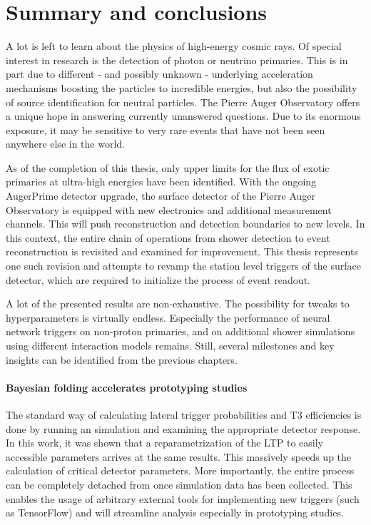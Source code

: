 
\chapter{Summary and conclusions}
\label{chap:summary-and-conclusions}

A lot is left to learn about the physics of high-energy cosmic rays. Of special interest in research is the detection of photon or neutrino primaries. This is in 
part due to different - and possibly unknown - underlying acceleration mechanisms boosting the particles to incredible energies, but also the possibility of 
source identification for neutral particles. The Pierre Auger Observatory offers a unique hope in answering currently unanswered questions. Due to its enormous 
exposure, it may be sensitive to very rare events that have not been seen anywhere else in the world. 

As of the completion of this thesis, only upper limits for the flux of exotic primaries at ultra-high energies have been identified. With the ongoing AugerPrime 
detector upgrade, the surface detector of the Pierre Auger Observatory is equipped with new electronics and additional measurement channels. This will push 
reconstruction and detection boundaries to new levels. In this context, the entire chain of operations from shower detection to event reconstruction is revisited 
and examined for improvement. This thesis represents one such revision and attempts to revamp the station level triggers of the surface detector, which are 
required to initialize the process of event readout. 

A lot of the presented results are non-exhaustive. The possibility for tweaks to hyperparameters is virtually endless. Especially the performance of neural network
triggers on non-proton primaries, and on additional shower simulations using different interaction models remains. Still, several milestones and key insights can 
be identified from the previous chapters.

\subsubsection{Bayesian folding accelerates prototyping studies}

The standard way of calculating lateral trigger probabilities and T3 efficiencies is done by running an \Offline simulation and examining the appropriate detector 
response. In this work, it was shown that a reparametrization of the LTP to easily accessible parameters arrives at the same results. This massively speeds up 
the calculation of critical detector parameters. More importantly, the entire process can be completely detached from \Offline once simulation data has been 
collected. This enables the usage of arbitrary external tools for implementing new triggers (such as TensorFlow) and will streamline analysis especially in 
prototyping studies. 

